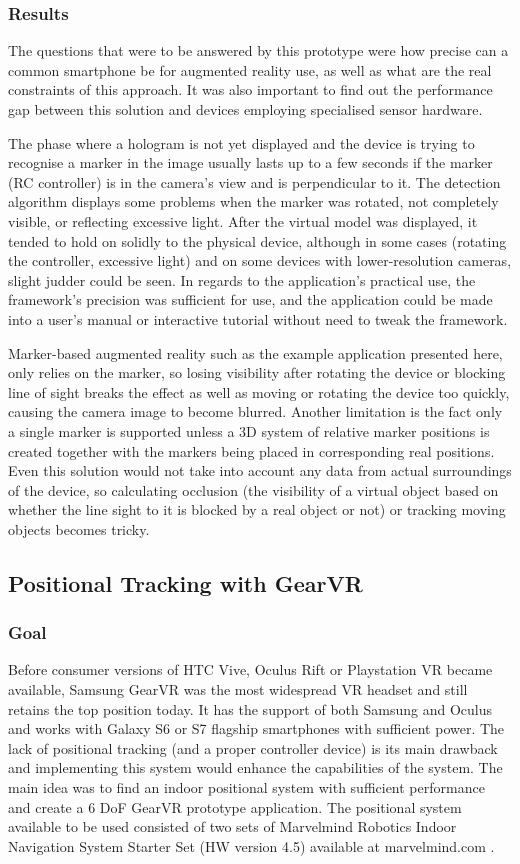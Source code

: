 \documentclass[12pt, a4paper]{article}
\begin{document}
\subsubsection{Results}
The questions that were to be answered by this prototype were how precise can a common smartphone be for augmented reality use, as well as what are the real constraints of this approach. It was also important to find out the performance gap between this solution and devices employing specialised sensor hardware.

The phase where a hologram is not yet displayed and the device is trying to recognise a marker in the image usually lasts up to a few seconds if the marker (RC controller) is in the camera’s view and is perpendicular to it. The detection algorithm displays some problems when the marker was rotated, not completely visible, or reflecting excessive light. After the virtual model was displayed, it tended to hold on solidly to the physical device, although in some cases (rotating the controller, excessive light) and on some devices with lower-resolution cameras, slight judder could be seen. In regards to the application’s practical use, the framework’s precision was sufficient for use, and the application could be made into a user’s manual or interactive tutorial without need to tweak the framework.

Marker-based augmented reality such as the example application presented here, only relies on the marker, so losing visibility after rotating the device or blocking line of sight breaks the effect as well as moving or rotating the device too quickly, causing the camera image to become blurred. Another limitation is the fact only a single marker is supported unless a 3D system of relative marker positions is created together with the markers being placed in corresponding real positions. Even this solution would not take into account any data from actual surroundings of the device, so calculating occlusion (the visibility of a virtual object based on whether the line sight to it is blocked by a real object or not) or tracking moving objects becomes tricky.

\subsection{Positional Tracking with GearVR}
\subsubsection{Goal}
Before consumer versions of HTC Vive, Oculus Rift or Playstation VR became available, Samsung GearVR was the most widespread VR headset and still retains the top position today. It has the support of both Samsung and Oculus and works with Galaxy S6 or S7 flagship smartphones with sufficient power. The lack of positional tracking (and a proper controller device) is its main drawback and implementing this system would enhance the capabilities of the system. The main idea was to find an indoor positional system with sufficient performance and create a 6 DoF GearVR prototype application. The positional system available to be used consisted of two sets of Marvelmind Robotics Indoor Navigation System Starter Set (HW version 4.5) available at marvelmind.com .
\end{document}
